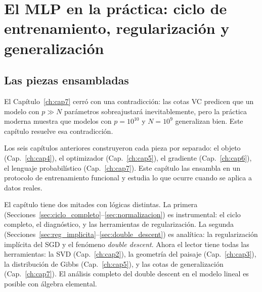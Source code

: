 
\chapter{El MLP en la práctica: ciclo de entrenamiento, regularización
  y generalización}
\label{ch:cap8}

\section{Las piezas ensambladas}
\label{sec:apertura8}


El Capítulo~\ref{ch:cap7} cerró con una contradicción: las cotas VC
predicen que un modelo con $p \gg N$ parámetros sobreajustará
inevitablemente, pero la práctica moderna muestra que modelos con
$p = 10^{10}$ y $N = 10^9$ generalizan bien. Este capítulo resuelve esa
contradicción.

Los seis capítulos anteriores construyeron cada pieza por separado: el
objeto (Cap.~\ref{ch:cap4}), el optimizador (Cap.~\ref{ch:cap5}), el
gradiente (Cap.~\ref{ch:cap6}), el lenguaje probabilístico
(Cap.~\ref{ch:cap7}). Este capítulo las ensambla en un protocolo de
entrenamiento funcional y estudia lo que ocurre cuando se aplica a datos
reales.

El capítulo tiene dos mitades con lógicas distintas. La primera
(Secciones~\ref{sec:ciclo_completo}--\ref{sec:normalizacion}) es
instrumental: el ciclo completo, el diagnóstico, y las herramientas de
regularización. La segunda
(Secciones~\ref{sec:reg_implicita}--\ref{sec:double_descent}) es
analítica: la regularización implícita del SGD y el fenómeno
\textit{double descent}. Ahora el lector tiene todas las herramientas: la
SVD (Cap.~\ref{ch:cap2}), la geometría del paisaje (Cap.~\ref{ch:cap3}),
la distribución de Gibbs (Cap.~\ref{ch:cap5}), y las cotas de
generalización (Cap.~\ref{ch:cap7}). El análisis completo del double
descent en el modelo lineal es posible con álgebra elemental.

